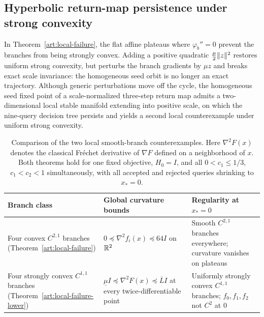 \subsection{Hyperbolic return-map persistence under strong convexity}

In Theorem~\ref{art:local-failure}, the flat affine plateaus where $\varphi_b''=0$
prevent the branches from being strongly convex. Adding a positive quadratic
$\tfrac\mu2\lVert z\rVert^2$ restores uniform strong convexity, but perturbs the
branch gradients by $\mu z$ and breaks exact scale invariance: the homogeneous
seed orbit is no longer an exact trajectory. Although generic perturbations move
off the cycle, the homogeneous seed fixed point of a scale-normalized three-step
return map admits a two-dimensional local stable manifold extending into
positive scale, on which the nine-query decision tree persists and yields a
second local counterexample under uniform strong convexity.



\begin{table}[tbp]
\centering
\begin{tabular}{@{}>{\raggedright\arraybackslash}p{}>{\raggedright\arraybackslash}p{}>{\raggedright\arraybackslash}p{}@{}}
\toprule
Branch class & Global curvature bounds & Regularity at $x_*=0$\\
\midrule
Four convex $C^{2,1}$ branches (Theorem~\ref{art:local-failure})
& $0\preceq\nabla^2f_i(x)\preceq64I$ on $\mathbb R^2$
& Smooth $C^{2,1}$ branches everywhere; curvature vanishes on plateaus\\[3pt]
Four strongly convex $C^{1,1}$ branches (Theorem~\ref{art:local-failure-lower})
& $\underline\mu I\preceq\nabla^2F(x)\preceq\overline L I$ at every twice-differentiable point
& Uniformly strongly convex $C^{1,1}$ branches; $f_0,f_1,f_2$ not $C^2$ at $0$\\
\bottomrule
\end{tabular}
\caption{Comparison of the two local smooth-branch counterexamples. Here
$\nabla^2F(x)$ denotes the classical Fr\'echet derivative of $\nabla F$ defined
on a neighborhood of $x$. Both theorems hold for one fixed objective, $H_0=I$,
and all $0<c_1\le1/3$, $c_1<c_2<1$ simultaneously, with all accepted and
rejected queries shrinking to $x_*=0$.}
\label{art:regularity-map}
\end{table}


